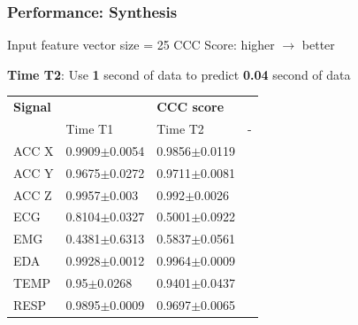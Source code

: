\documentclass[unknownkeysallowed]{beamer}
\begin{document}
\begin{frame}
\frametitle{Performance: Synthesis}

Input feature vector size = 25 \newline 
CCC Score: higher $\longrightarrow$ better

\textbf{Time T2}: Use \textbf{1} second of data to predict \textbf{0.04} second of data


\begin{table}
	\renewcommand{\arraystretch}{1.3}
	\label{syn_ccc_s_list}
	\centering
	\begin{tabular}{llll}
		\hline
		\bfseries Signal  & \bfseries  & \bfseries CCC score & \bfseries \\
		       &  Time T1 &  Time T2 & - \\
		\hline
		ACC X &   0.9909$\pm$0.0054 & 0.9856$\pm$0.0119 \\ %
		ACC Y &   0.9675$\pm$0.0272 & 0.9711$\pm$0.0081 \\ %
		ACC Z  &   0.9957$\pm$0.003 & 0.992$\pm$0.0026 \\ %
		ECG &   0.8104$\pm$0.0327 & 0.5001$\pm$0.0922 \\ %
		EMG &   0.4381$\pm$0.6313 & 0.5837$\pm$0.0561 \\ %
		EDA &   0.9928$\pm$0.0012 & 0.9964$\pm$0.0009 \\ %
		TEMP &  0.95$\pm$0.0268 & 0.9401$\pm$0.0437  \\ %
		RESP &  0.9895$\pm$0.0009 & 0.9697$\pm$0.0065 \\ %
		\hline
	\end{tabular}
\end{table}

\end{frame}
\end{document}
